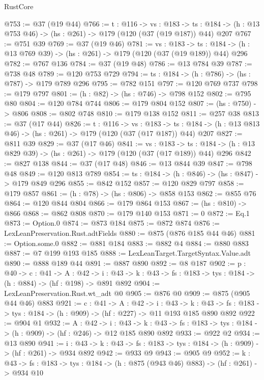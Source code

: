 \begin{lexlean}{RustCore}
\begin{coremodule}
@753 := @37 (@19 @44)
@766 := {t : @116} ->
  {vs : @183} ->
  {ts : @184} -> (h : @13 @753 @46) -> (hs : @261) -> @179 (@120 (@37 (@19 @187)) @44) @207
@767 := @751 @39
@769 := @37 (@19 @46)
@781 := {vs : @183} ->
  {ts : @184} -> (h : @13 @769 @39) -> (hs : @261) -> @179 (@120 (@37 (@19 @189)) @44) @296
@782 := @767 @136
@784 := @37 (@19 @48)
@786 := @13 @784 @39
@787 := @738 @48
@789 := @120 @753 @729
@794 := {ts : @184} -> (h : @786) -> (hs : @787) -> @179 @789 @296
@795 := @782 @151
@797 := @120 @769 @737
@798 := @179 @797
@801 := (h : @82) -> (hs : @746) -> @798 @152
@802 := @795 @80
@804 := @120 @784 @744
@806 := @179 @804 @152
@807 := (hs : @750) -> @806
@808 := @802 @748
@810 := @179 @138 @152
@811 := @257 @38
@813 := @37 (@17 @44)
@826 := {t : @116} ->
  {vs : @183} ->
  {ts : @184} -> (h : @13 @813 @46) -> (hs : @261) -> @179 (@120 (@37 (@17 @187)) @44) @207
@827 := @811 @39
@829 := @37 (@17 @46)
@841 := {vs : @183} ->
  {ts : @184} -> (h : @13 @829 @39) -> (hs : @261) -> @179 (@120 (@37 (@17 @189)) @44) @296
@842 := @827 @138
@844 := @37 (@17 @48)
@846 := @13 @844 @39
@847 := @798 @48
@849 := @120 @813 @789
@854 := {ts : @184} -> (h : @846) -> (hs : @847) -> @179 @849 @296
@855 := @842 @152
@857 := @120 @829 @797
@858 := @179 @857
@861 := (h : @78) -> (hs : @806) -> @858 @153
@862 := @855 @76
@864 := @120 @844 @804
@866 := @179 @864 @153
@867 := (hs : @810) -> @866
@868 := @862 @808
@870 := @179 @140 @153
@871 := 0
@872 := Eq.{1}
@873 := Option.{0}
@874 := @873 @184
@875 := @872 @874
@876 := LexLeanPreservation.Rust.adtFields
@880 := @875 (@876 @185 @44 @46)
@881 := Option.some.{0}
@882 := @881 @184
@883 := @882 @4
@884 := @880 @883
@887 := @7 @199 @193 @185
@888 := LexLeanTarget.TargetSyntax.Value.adt
@890 := @888 @189 @44
@891 := @887 @890
@892 := @8 @187
@902 := {p : @40} ->
  {c : @41} ->
  {A : @42} ->
  {i : @43} -> {k : @43} -> {fs : @183} -> {tys : @184} -> (h : @884) -> (hf : @198) -> @891 @892
@904 := LexLeanPreservation.Rust.wt_adt @0
@905 := @876 @0
@909 := @875 (@905 @44 @46) @883
@921 := {c : @41} ->
  {A : @42} ->
  {i : @43} ->
  {k : @43} -> {fs : @183} -> {tys : @184} -> (h : @909) -> (hf : @227) -> @11 @193 @185 @890 @892
@922 := @904 @1
@932 := {A : @42} ->
  {i : @43} ->
  {k : @43} -> {fs : @183} -> {tys : @184} -> (h : @909) -> (hf : @246) -> @12 @185 @890 @892
@933 := @922 @2
@934 := @13 @890
@941 := {i : @43} ->
  {k : @43} -> {fs : @183} -> {tys : @184} -> (h : @909) -> (hf : @261) -> @934 @892
@942 := @933 @9
@943 := @905 @9
@952 := {k : @43} ->
  {fs : @183} -> {tys : @184} -> (h : @875 (@943 @46) @883) -> (hf : @261) -> @934 @10

\end{coremodule}
\end{lexlean}
